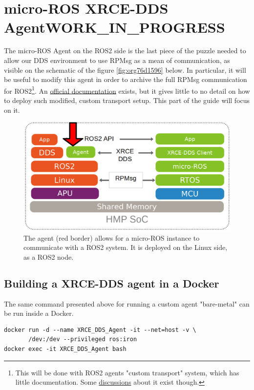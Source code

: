 \documentclass[10pt]{article}
\begin{document}
\section{micro-ROS XRCE-DDS Agent\hfill{}\textsc{WORK\_IN\_PROGRESS}}
\label{sec:org81d29a1}
The micro-ROS Agent on the ROS2 side is the last piece of the puzzle needed to
allow our DDS environment to use RPMsg as a mean of communication, as visible
on the schematic of the figure \ref{fig:org76d1596} below.
In particular, it will be useful to modify this agent in order to archive
the full RPMsg communication for ROS2\footnote{This will be done with ROS2 agents "custom transport"  system,
which has little documentation. Some \href{https://github.com/micro-ROS/micro\_ros\_setup/issues/383}{discussions} about it exist though.\label{org67b459b}}.
An \href{https://micro.ros.org/docs/tutorials/advanced/create\_custom\_transports/}{official documentation} exists, but it gives little to no detail
on how to deploy such modified, custom transport setup.
This part of the guide will focus on it.

\begin{figure}[htbp]
\centering
\includegraphics[width=.6\textwidth]{./img/map_agent.png}
\caption{\label{fig:orga3ff682}The agent (red border) allows for a micro-ROS instance to communicate with a ROS2 system. It is deployed on the Linux side, as a ROS2 node.}
\end{figure}

\subsection{Building a XRCE-DDS agent in a Docker}
\label{sec:org285c741}
The same command presented above for running a custom agent "bare-metal" can be
run inside a Docker.

\begin{verbatim}
docker run -d --name XRCE_DDS_Agent -it --net=host -v \
       /dev:/dev --privileged ros:iron
docker exec -it XRCE_DDS_Agent bash
\end{verbatim}
\end{document}
